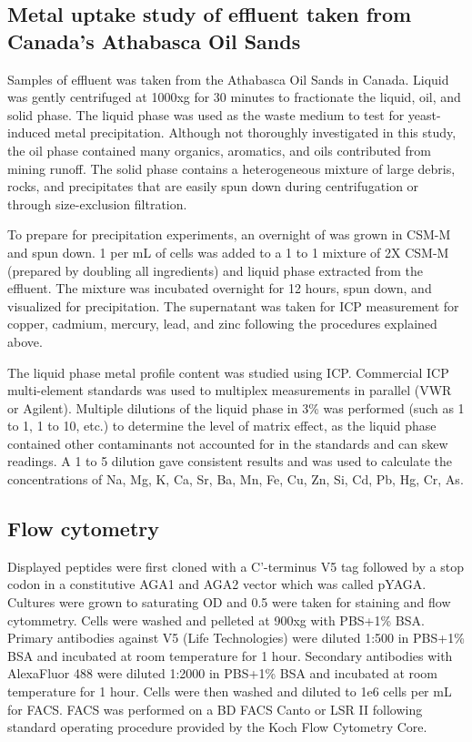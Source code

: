 \documentclass[../main/main]{subfiles}
\begin{document}
\subsection*{Metal uptake study of effluent taken from Canada's Athabasca Oil Sands}
Samples of effluent was taken from the Athabasca Oil Sands in Canada. Liquid was gently centrifuged at 1000xg for 30 minutes to fractionate the liquid, oil, and solid phase. The liquid phase was used as the waste medium to test for yeast-induced metal precipitation. Although not thoroughly investigated in this study, the oil phase contained many organics, aromatics, and oils contributed from mining runoff. The solid phase contains a heterogeneous mixture of large debris, rocks, and precipitates that are easily spun down during centrifugation or through size-exclusion filtration.

To prepare for precipitation experiments, an overnight of  was grown in CSM-M and spun down. 1 \OD{} per mL of cells was added to a 1 to 1 mixture of 2X CSM-M (prepared by doubling all ingredients) and liquid phase extracted from the effluent. The mixture was incubated overnight for 12 hours, spun down, and visualized for precipitation. The supernatant was taken for ICP measurement for copper, cadmium, mercury, lead, and zinc following the procedures explained above.

The liquid phase metal profile content was studied using ICP. Commercial ICP multi-element standards was used to multiplex measurements in parallel (VWR or Agilent). Multiple dilutions of the liquid phase in 3\%  was performed (such as 1 to 1, 1 to 10, etc.) to determine the level of matrix effect, as the liquid phase contained other contaminants not accounted for in the standards and can skew readings. A 1 to 5 dilution gave consistent results and was used to calculate the concentrations of Na, Mg, K, Ca, Sr, Ba, Mn, Fe, Cu, Zn, Si, Cd, Pb, Hg, Cr, As.

\subsection*{Flow cytometry}
Displayed peptides were first cloned with a C'-terminus V5 tag followed by a stop codon in a constitutive AGA1 and AGA2 vector which was called pYAGA. Cultures were grown to saturating OD and 0.5 \OD{} were taken for staining and flow cytommetry. Cells were washed and pelleted at 900xg with PBS+1\% BSA. Primary antibodies against V5 (Life Technologies) were diluted 1:500 in PBS+1\% BSA and incubated at room temperature for 1 hour. Secondary antibodies with AlexaFluor 488 were diluted 1:2000 in PBS+1\% BSA and incubated at room temperature for 1 hour. Cells were then washed and diluted to 1e6 cells per mL for FACS. FACS was performed on a BD FACS Canto or LSR II following standard operating procedure provided by the Koch Flow Cytometry Core.
\end{document}
